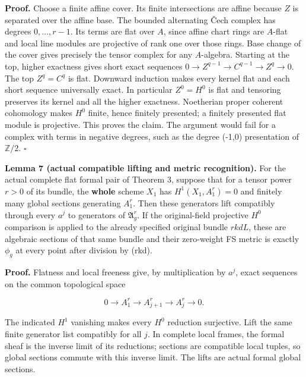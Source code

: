 \documentclass[
  11pt,
]{article}
\begin{document}
\textbf{Proof.} Choose a finite affine cover. Its finite intersections
are affine because \(Z\) is separated over the affine base. The bounded
alternating Čech complex has degrees \(0,\ldots,r-1\). Its terms are
flat over \(A\), since affine chart rings are \(A\)-flat and local line
modules are projective of rank one over those rings. Base change of the
cover gives precisely the tensor complex for any \(A\)-algebra. Starting
at the top, higher exactness gives short exact sequences
\(0\to Z^{q-1}\to C^{q-1}\to Z^q\to0\). The top \(Z^q=C^q\) is flat.
Downward induction makes every kernel flat and each short sequence
universally exact. In particular \(Z^0=H^0\) is flat and tensoring
preserves its kernel and all the higher exactness. Noetherian proper
coherent cohomology makes \(H^0\) finite, hence finitely presented; a
finitely presented flat module is projective. This proves the claim. The
argument would fail for a complex with terms in negative degrees, such
as the degree (-1,0) presentation of \(\mathbb Z/2\). \(\square\)

\textbf{Lemma 7 (actual compatible lifting and metric recognition).} For
the actual complete flat formal pair of Theorem 3, suppose that for a
tensor power \(r>0\) of its bundle, the \textbf{whole} scheme \(X_1\)
has \(H^1(X_1,A_1^r)=0\) and finitely many global sections generating
\(A_1^r\). Then these generators lift compatibly through every \(a^j\)
to generators of \(\mathfrak A_g^r\). If the original-field projective
\(H^0\) comparison is applied to the already specified original bundle
\(rkdL\), these are algebraic sections of that same bundle and their
zero-weight FS metric is exactly \(\phi_g\) at every point after
division by (rkd).

\textbf{Proof.} Flatness and local freeness give, by multiplication by
\(a^j\), exact sequences on the common topological space

\[
 0\longrightarrow A_1^r\longrightarrow A_{j+1}^r
       \longrightarrow A_j^r\longrightarrow0.
\]

The indicated \(H^1\) vanishing makes every \(H^0\) reduction
surjective. Lift the same finite generator list compatibly for all
\(j\). In complete local frames, the formal sheaf is the inverse limit
of its reductions; sections are compatible local tuples, so global
sections commute with this inverse limit. The lifts are actual formal
global sections.
\end{document}
